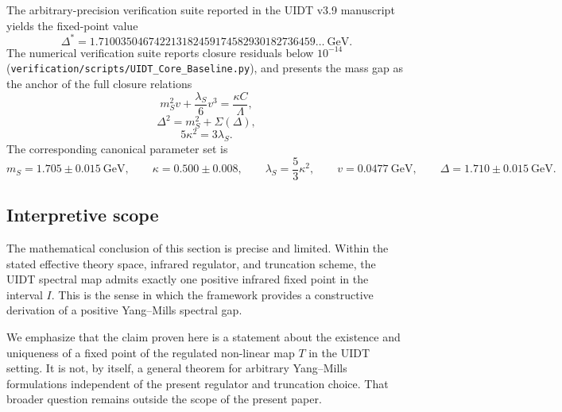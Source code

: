 The arbitrary-precision verification suite reported in the UIDT v3.9 manuscript yields the fixed-point value
\begin{equation}
\Delta^*
=
1.710035046742213182459174582930182736459\ldots\ \mathrm{GeV}.
\label{eq:high_prec_value}
\end{equation}
The numerical verification suite reports closure residuals below \(10^{-14}\)
(\texttt{verification/scripts/UIDT\_Core\_Baseline.py}),
and presents the mass gap as the anchor of the full closure relations
\begin{equation}
m_S^2 v+\frac{\lambda_S}{6}v^3=\frac{\kappa C}{\Lambda},
\label{eq:closure_1}
\end{equation}
\begin{equation}
\Delta^2=m_S^2+\Sigma(\Delta),
\label{eq:closure_2}
\end{equation}
\begin{equation}
5\kappa^2=3\lambda_S.
\label{eq:closure_3}
\end{equation}
The corresponding canonical parameter set is
\begin{equation}
m_S = 1.705 \pm 0.015\ \mathrm{GeV},\qquad
\kappa = 0.500 \pm 0.008,\qquad
\lambda_S = \frac{5}{3}\kappa^2,\qquad
v = 0.0477\ \mathrm{GeV},\qquad
\Delta = 1.710 \pm 0.015\ \mathrm{GeV}.
\label{eq:final_params}
\end{equation}

\subsection{Interpretive scope}

The mathematical conclusion of this section is precise and limited. Within the stated effective theory space, infrared regulator, and truncation scheme, the UIDT spectral map admits exactly one positive infrared fixed point in the interval \(I\). This is the sense in which the framework provides a constructive derivation of a positive Yang--Mills spectral gap.

We emphasize that the claim proven here is a statement about the existence and uniqueness of a fixed point of the regulated non-linear map \(T\) in the UIDT setting. It is not, by itself, a general theorem for arbitrary Yang--Mills formulations independent of the present regulator and truncation choice. That broader question remains outside the scope of the present paper.
